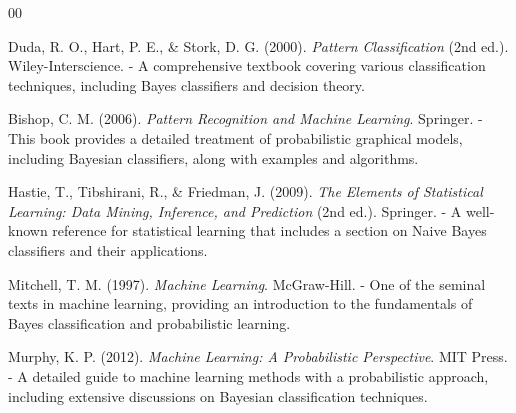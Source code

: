 \documentclass[conference]{IEEEtran}
\begin{document}
	
	\begin{thebibliography}{00}
		
		 Duda, R. O., Hart, P. E., \& Stork, D. G. (2000). \textit{Pattern Classification} (2nd ed.). Wiley-Interscience.
		- A comprehensive textbook covering various classification techniques, including Bayes classifiers and decision theory.
		
		 Bishop, C. M. (2006). \textit{Pattern Recognition and Machine Learning}. Springer.
		- This book provides a detailed treatment of probabilistic graphical models, including Bayesian classifiers, along with examples and algorithms.
		
		 Hastie, T., Tibshirani, R., \& Friedman, J. (2009). \textit{The Elements of Statistical Learning: Data Mining, Inference, and Prediction} (2nd ed.). Springer.
		- A well-known reference for statistical learning that includes a section on Naive Bayes classifiers and their applications.
		
		 Mitchell, T. M. (1997). \textit{Machine Learning}. McGraw-Hill.
		- One of the seminal texts in machine learning, providing an introduction to the fundamentals of Bayes classification and probabilistic learning.
		
		 Murphy, K. P. (2012). \textit{Machine Learning: A Probabilistic Perspective}. MIT Press.
		- A detailed guide to machine learning methods with a probabilistic approach, including extensive discussions on Bayesian classification techniques.
		
	\end{thebibliography}

	
\end{document}
